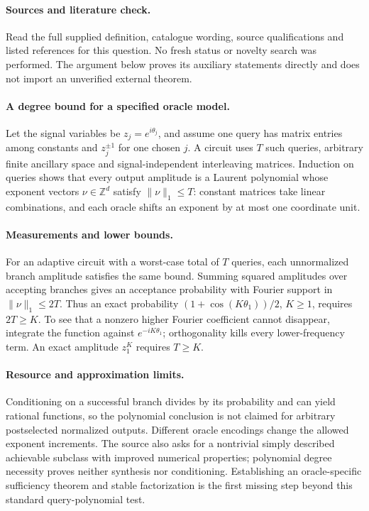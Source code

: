 \documentclass[11pt]{article}
\begin{document}
\paragraph{Sources and literature check.}
Read the full supplied definition, catalogue wording, source qualifications and listed references for this question. No fresh status or novelty search was performed. The argument below proves its auxiliary statements directly and does not import an unverified external theorem.

\paragraph{A degree bound for a specified oracle model.} Let the signal variables be \(z_j=e^{i\theta_j}\), and assume one query has matrix entries among constants and \(z_j^{\pm1}\) for one chosen \(j\). A circuit uses \(T\) such queries, arbitrary finite ancillary space and signal-independent interleaving matrices. Induction on queries shows that every output amplitude is a Laurent polynomial whose exponent vectors \(\nu\in\mathbb Z^d\) satisfy \(\|\nu\|_1\leq T\): constant matrices take linear combinations, and each oracle shifts an exponent by at most one coordinate unit.
\paragraph{Measurements and lower bounds.} For an adaptive circuit with a worst-case total of \(T\) queries, each unnormalized branch amplitude satisfies the same bound. Summing squared amplitudes over accepting branches gives an acceptance probability with Fourier support in \(\|\nu\|_1\leq2T\). Thus an exact probability \((1+\cos(K\theta_1))/2\), \(K\geq1\), requires \(2T\geq K\). To see that a nonzero higher Fourier coefficient cannot disappear, integrate the function against \(e^{-iK\theta_1}\); orthogonality kills every lower-frequency term. An exact amplitude \(z_1^K\) requires \(T\geq K\).
\paragraph{Resource and approximation limits.} Conditioning on a successful branch divides by its probability and can yield rational functions, so the polynomial conclusion is not claimed for arbitrary postselected normalized outputs. Different oracle encodings change the allowed exponent increments. The source also asks for a nontrivial simply described achievable subclass with improved numerical properties; polynomial degree necessity proves neither synthesis nor conditioning. Establishing an oracle-specific sufficiency theorem and stable factorization is the first missing step beyond this standard query-polynomial test.
\end{document}
